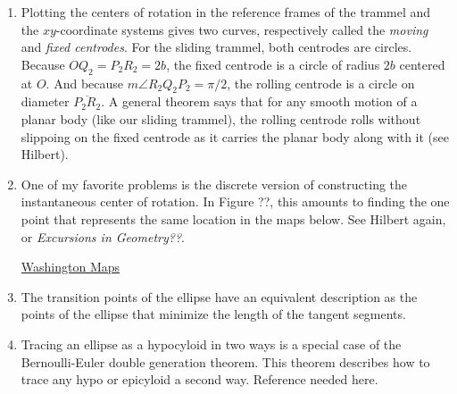 \documentclass{ximera}
\begin{document}
\begin{enumerate}
\item Plotting the centers of rotation in the reference frames of the trammel and the $xy$-coordinate systems gives two curves, respectively called the \emph{moving} and \emph{fixed centrodes}. For the sliding trammel, both centrodes are circles. Because $OQ_2 = P_2R_2 = 2b$, the fixed centrode is a circle of radius $2b$ centered at $O$. And because $m\angle R_2Q_2P_2  =\pi/2$, the rolling centrode is a circle on diameter $\overline{P_2R_2}$. A general theorem says that for any smooth motion of a planar body (like our sliding trammel), the rolling centrode rolls without slippoing on the fixed centrode as it carries the planar body along with it (see Hilbert). 

\item One of my favorite problems is the discrete version of constructing the instantaneous center of rotation. In Figure ??, this amounts to finding the one point that represents the same location in the maps below. See Hilbert again, or \emph{Excursions in Geometry??}.

\begin{onlineOnly}
    \begin{center}
\end{center}
\end{onlineOnly}

\href{https://www.desmos.com/calculator/cthwmjxkp2}{Washington Maps}


\item The transition points of the ellipse have an equivalent description as the points of the ellipse that minimize the length of the tangent segments.

 


\item Tracing an ellipse as a hypocyloid in two ways is a special case of the Bernoulli-Euler double generation theorem. This theorem describes how to trace any hypo or epicyloid a second way. Reference needed here.
\end{enumerate}
\end{document}
